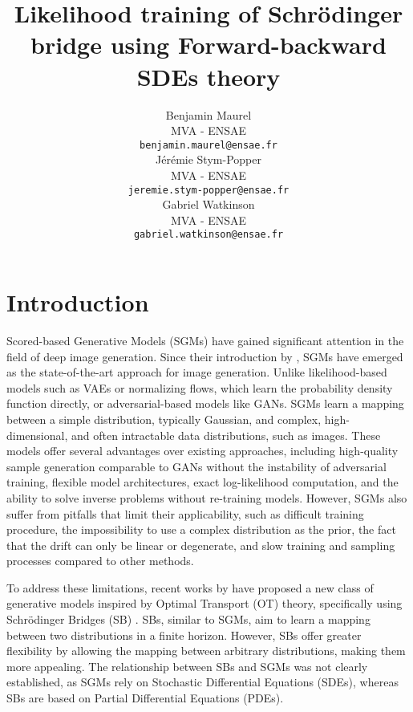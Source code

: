 \documentclass{article}
\title{Likelihood training of Schrödinger bridge using Forward-backward SDEs theory}
\author{
  Benjamin Maurel\\
  MVA - ENSAE\\
  \texttt{benjamin.maurel@ensae.fr}\\
  \And
  Jérémie Stym-Popper\\
  MVA - ENSAE\\
  \texttt{jeremie.stym-popper@ensae.fr}\\
  \And
  Gabriel Watkinson\\
  MVA - ENSAE\\
  \texttt{gabriel.watkinson@ensae.fr}\\
}
\begin{document}
\maketitle



\section*{Introduction}

Scored-based Generative Models (SGMs) have gained significant attention in the field of deep image generation.
Since their introduction by \citet{song2020score}, SGMs have emerged as the state-of-the-art approach for image generation.
Unlike likelihood-based models such as VAEs or normalizing flows, which learn the probability density function directly, or adversarial-based models like GANs.
SGMs learn a mapping between a simple distribution, typically Gaussian, and complex, high-dimensional, and often intractable data distributions, such as images.
These models offer several advantages over existing approaches, including high-quality sample generation comparable to GANs without the instability of adversarial training, flexible model architectures, exact log-likelihood computation, and the ability to solve inverse problems without re-training models.
However, SGMs also suffer from pitfalls that limit their applicability, such as difficult training procedure, the impossibility to use a complex distribution as the prior, the fact that the drift can only be linear or degenerate, and slow training and sampling processes compared to other methods.

To address these limitations, recent works by \cite{debortoli2023diffusion, pmlr-v139-wang21l, vargas2021solving} have proposed a new class of generative models inspired by Optimal Transport (OT) theory, specifically using Schrödinger Bridges (SB) \cite{schrodinger1932theorie}.
SBs, similar to SGMs, aim to learn a mapping between two distributions in a finite horizon.
However, SBs offer greater flexibility by allowing the mapping between arbitrary distributions, making them more appealing.
The relationship between SBs and SGMs was not clearly established, as SGMs rely on Stochastic Differential Equations (SDEs), whereas SBs are based on Partial Differential Equations (PDEs).
\end{document}

